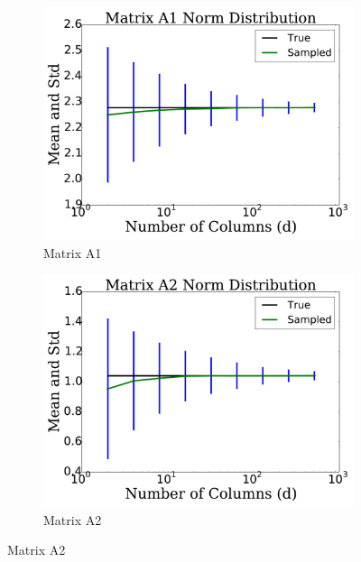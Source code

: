 
\begin{figure}[p]
    \centering

    \begin{subfigure}{0.45\textwidth}
    \includegraphics[width=\textwidth]{plots/mat_A1_error_test.pdf}
    \caption{Matrix A1}
    \end{subfigure}
    \begin{subfigure}{0.45\textwidth}
    \includegraphics[width=\textwidth]{plots/mat_A2_error_test.pdf}
    \caption{Matrix A2}
    \end{subfigure}


\end{figure}
